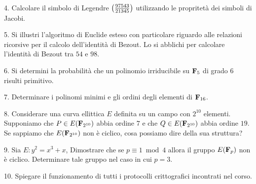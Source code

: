 \item{4.} Calcolare il simbolo di Legendre $\left({97543\over 21345}\right)$ utilizzando le propritet\`a dei simboli di Jacobi.  
\vv


\item{5.} Si illustri l'algoritmo di Euclide esteso con particolare riguardo alle relazioni ricorsive per il calcolo dell'identit\`a di
Bezout. Lo si abblichi per calcolare l'identit\`a di Bezout tra $54$ e $98$.
\ve\vs

\item{6.} Si determini la probabilit\`a che un polinomio irriducibile su ${\bf F}_5$ di grado $6$ risulti primitivo.

\vv

\item{7.} Determinare i polinomi minimi e gli ordini degli elementi di ${\bf F}_{16}$.
\vv

\item{8.} Considerare una curva ellittica $E$ definita su un campo con $2^{10}$ elementi. Supponiamo che $P\in E({\bf F}_{2^{10}})$
abbia ordine $7$ e che $Q\in E({\bf F}_{2^{10}})$ abbia ordine $19$. Se sappiamo che $E({\bf F}_{2^{10}})$ non \`e ciclico, cosa possiamo
dire della sua struttura?
\ve \vs

\item{9.} Sia $E: y^2=x^3+x$,  Dimostrare che se $p\equiv1\bmod4$ allora il gruppo $E({\bf F}_p)$ non \`e ciclico.
Determinare tale gruppo nel caso in cui $p=3$.
\vv

\item{10.} Spiegare il funzionamento di tutti i protocolli crittografici incontrati nel corso.
\ \vst

 \bye
